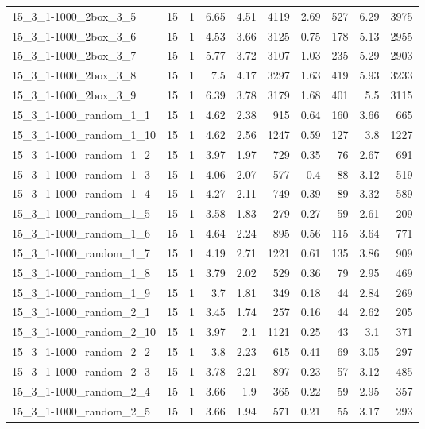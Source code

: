\begin{center}
\begin{scriptsize}
\begin{longtable}{lrrrrrrrrr}
15\_3\_1-1000\_2box\_3\_5 & 15 & 1 & 6.65 & 4.51 & 4119 & 2.69 & 527 & 6.29 & 3975\\
15\_3\_1-1000\_2box\_3\_6 & 15 & 1 & 4.53 & 3.66 & 3125 & 0.75 & 178 & 5.13 & 2955\\
15\_3\_1-1000\_2box\_3\_7 & 15 & 1 & 5.77 & 3.72 & 3107 & 1.03 & 235 & 5.29 & 2903\\
15\_3\_1-1000\_2box\_3\_8 & 15 & 1 & 7.5 & 4.17 & 3297 & 1.63 & 419 & 5.93 & 3233\\
15\_3\_1-1000\_2box\_3\_9 & 15 & 1 & 6.39 & 3.78 & 3179 & 1.68 & 401 & 5.5 & 3115\\
15\_3\_1-1000\_random\_1\_1 & 15 & 1 & 4.62 & 2.38 & 915 & 0.64 & 160 & 3.66 & 665\\
15\_3\_1-1000\_random\_1\_10 & 15 & 1 & 4.62 & 2.56 & 1247 & 0.59 & 127 & 3.8 & 1227\\
15\_3\_1-1000\_random\_1\_2 & 15 & 1 & 3.97 & 1.97 & 729 & 0.35 & 76 & 2.67 & 691\\
15\_3\_1-1000\_random\_1\_3 & 15 & 1 & 4.06 & 2.07 & 577 & 0.4 & 88 & 3.12 & 519\\
15\_3\_1-1000\_random\_1\_4 & 15 & 1 & 4.27 & 2.11 & 749 & 0.39 & 89 & 3.32 & 589\\
15\_3\_1-1000\_random\_1\_5 & 15 & 1 & 3.58 & 1.83 & 279 & 0.27 & 59 & 2.61 & 209\\
15\_3\_1-1000\_random\_1\_6 & 15 & 1 & 4.64 & 2.24 & 895 & 0.56 & 115 & 3.64 & 771\\
15\_3\_1-1000\_random\_1\_7 & 15 & 1 & 4.19 & 2.71 & 1221 & 0.61 & 135 & 3.86 & 909\\
15\_3\_1-1000\_random\_1\_8 & 15 & 1 & 3.79 & 2.02 & 529 & 0.36 & 79 & 2.95 & 469\\
15\_3\_1-1000\_random\_1\_9 & 15 & 1 & 3.7 & 1.81 & 349 & 0.18 & 44 & 2.84 & 269\\
15\_3\_1-1000\_random\_2\_1 & 15 & 1 & 3.45 & 1.74 & 257 & 0.16 & 44 & 2.62 & 205\\
15\_3\_1-1000\_random\_2\_10 & 15 & 1 & 3.97 & 2.1 & 1121 & 0.25 & 43 & 3.1 & 371\\
15\_3\_1-1000\_random\_2\_2 & 15 & 1 & 3.8 & 2.23 & 615 & 0.41 & 69 & 3.05 & 297\\
15\_3\_1-1000\_random\_2\_3 & 15 & 1 & 3.78 & 2.21 & 897 & 0.23 & 57 & 3.12 & 485\\
15\_3\_1-1000\_random\_2\_4 & 15 & 1 & 3.66 & 1.9 & 365 & 0.22 & 59 & 2.95 & 357\\
15\_3\_1-1000\_random\_2\_5 & 15 & 1 & 3.66 & 1.94 & 571 & 0.21 & 55 & 3.17 & 293\\

\end{longtable}
\end{scriptsize}
\end{center}
